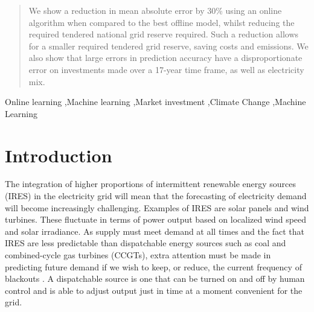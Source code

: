 \documentclass[final,3p,times,twocolumn,numbers]{elsarticle}
\begin{document}
\begin{frontmatter}
\begin{abstract}

We show a reduction in mean absolute error by 30\% using an online algorithm when compared to the best offline model, whilst reducing the required tendered national grid reserve required. Such a reduction allows for a smaller required tendered grid reserve, saving costs and emissions. We also show that large errors in prediction accuracy have a disproportionate error on investments made over a 17-year time frame, as well as electricity mix.


\end{abstract}



%
%

\begin{keyword}
Online learning \sep Machine learning \sep Market investment \sep Climate Change \sep Machine Learning


\end{keyword}

\end{frontmatter}


\section{Introduction}
\label{sec:intro}

The integration of higher proportions of intermittent renewable energy sources (IRES) in the electricity grid will mean that the forecasting of electricity demand will become increasingly challenging. Examples of IRES are solar panels and wind turbines. These fluctuate in terms of power output based on localized wind speed and solar irradiance. As supply must meet demand at all times and the fact that IRES are less predictable than dispatchable energy sources such as coal and combined-cycle gas turbines (CCGTs), extra attention must be made in predicting future demand if we wish to keep, or reduce, the current frequency of blackouts \cite{Lu1993}. A dispatchable source is one that can be turned on and off by human control and is able to adjust output just in time at a moment convenient for the grid.
\end{document}
